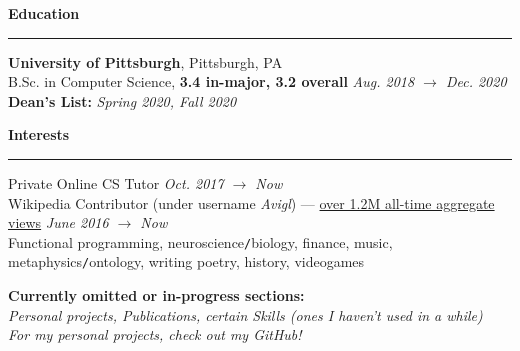 \documentclass[10pt]{article}
\begin{document}
\begin{flushleft}
		\vspace{1.5mm}
		{\large \raggedright \textbf{Education}}
		\vspace{1.25mm}
	
		\hrule
		
		\vspace{2.25mm}
		\textbf{University of Pittsburgh}, Pittsburgh, PA\\
      	{\small B.Sc. in Computer Science, \textbf{3.4 in-major, 3.2 overall} \hfill \textit{Aug. 2018 $\rightarrow$ Dec. 2020}}\\
		{\small \textbf{Dean's List:} \textit{Spring 2020, Fall 2020}}\\

		\vspace{1.25mm}
		{\large \raggedright \textbf{Interests}}
		\vspace{1.25mm}
	
		\hrule
	
		\vspace{2.25mm}
		Private Online CS Tutor \hfill \textit{\small Oct. 2017 $\rightarrow$ Now}\\
		Wikipedia Contributor (under username \textit{Avigl}) --- \href{https://pageviews.wmcloud.org/?project=en.wikipedia.org&platform=all-access&agent=user&redirects=0&range=all-time&pages=Timeline_of_social_media|Timeline_of_online_advertising|Timeline_of_e-commerce|Screening_Partnership_Program|Silicon_Valley_Education_Foundation|Chicago_Community_Trust}{over 1.2M all-time aggregate views} \hfill \textit{\small June 2016 $\rightarrow$ Now}\\
		Functional programming, neuroscience\texttt{/}biology, finance, music, metaphysics\texttt{/}ontology, writing poetry, history, videogames

		\vspace*{\fill}
		\textbf{\small Currently omitted or in-progress sections:}\\ 
		\textit{\small Personal projects, Publications, certain Skills (ones I haven't used in a while)}\\
		{\footnotesize \textit{For my personal projects, check out my GitHub!}}
	\end{flushleft}
\end{document}
